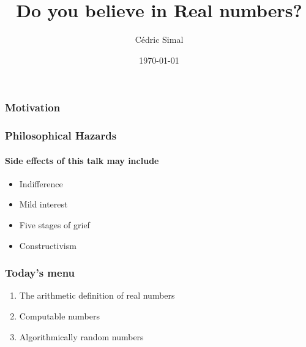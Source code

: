 \documentclass{beamer}
\author{Cédric Simal}
\date{\today}
\title{Do you believe in Real numbers?}
\begin{document}
\frame{\titlepage}

\begin{frame}
\frametitle{Motivation}


\end{frame}

\begin{frame}
\frametitle{Philosophical Hazards}
\framesubtitle{Side effects of this talk may include}
\begin{itemize}[<+->]
    \item Indifference
    \item Mild interest
    \item Five stages of grief
    \item Constructivism
\end{itemize}

\end{frame}

\begin{frame}
    \frametitle{Today's menu}
    \begin{enumerate}
        \item The arithmetic definition of real numbers
        \item Computable numbers
        \item Algorithmically random numbers
    \end{enumerate}
\end{frame}
\end{document}
